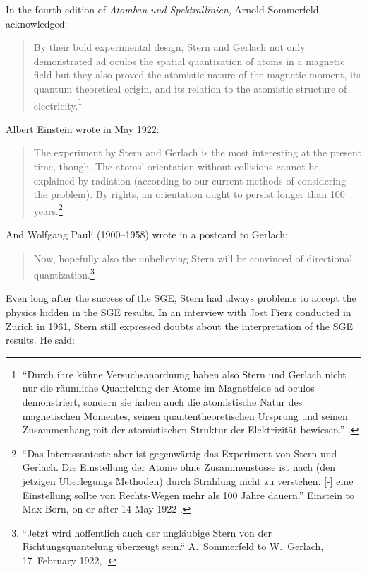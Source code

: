 \documentclass[12pt]{article}
\begin{document}
In the fourth edition of \emph{Atombau und Spektrallinien}, Arnold Sommerfeld acknowledged:
\begin{quote}
By their bold experimental design, Stern and Gerlach not only demonstrated ad oculos the spatial quantization of atoms in a magnetic field but they also proved the atomistic nature of the magnetic moment, its quantum theoretical origin, and its relation to the atomistic structure of electricity.\footnote{``Durch ihre kühne Versuchsanordnung haben also Stern und Gerlach nicht nur die räumliche Quantelung der Atome im Magnetfelde ad oculos demonstriert, sondern sie haben auch die atomistische Natur des magnetischen Momentes, seinen quantentheoretischen Ursprung und seinen Zusammenhang mit der atomistischen Struktur der Elektrizität bewiesen.''
\cite[p.~149]{SommerfeldA1924Atombau4}.}
\end{quote}
Albert Einstein wrote in May 1922:
\begin{quote}
The experiment by Stern and Gerlach is the most interesting at the present time, though. The atoms' orientation without collisions cannot be explained by radiation (according to our current methods of considering the problem). By rights, an orientation ought to persist longer than 100 years.\footnote{``Das Interessanteste aber ist gegenwärtig das Experiment von Stern und Gerlach. Die Einstellung  der Atome ohne Zusammenstösse ist nach (den jetzigen Überlegungs Methoden) durch Strahlung nicht zu verstehen. [-] eine Einstellung sollte von Rechts-Wegen mehr als 100 Jahre dauern.''  Einstein to Max Born, on or after 14 May 1922 \cite[Doc.~190]{CPAE13}.}
\end{quote}
And Wolfgang Pauli (1900--1958) wrote in a postcard to Gerlach: 
\begin{quote}
Now, hopefully also the unbelieving Stern will be convinced of directional quantization.\footnote{``Jetzt wird hoffentlich auch der ungläubige Stern von der Richtungsquantelung überzeugt sein.“ 
A.~Sommerfeld to W.~Gerlach, 17~February 1922, \cite[p.~55]{PauliW1979Briefwechsel}.}
\end{quote}
Even long after the success of the SGE, Stern had always problems to accept the physics hidden in the SGE results. In an interview with Jost Fierz conducted in Zurich in 1961, Stern still expressed doubts about the interpretation of the SGE results. He said: 
\end{document}

